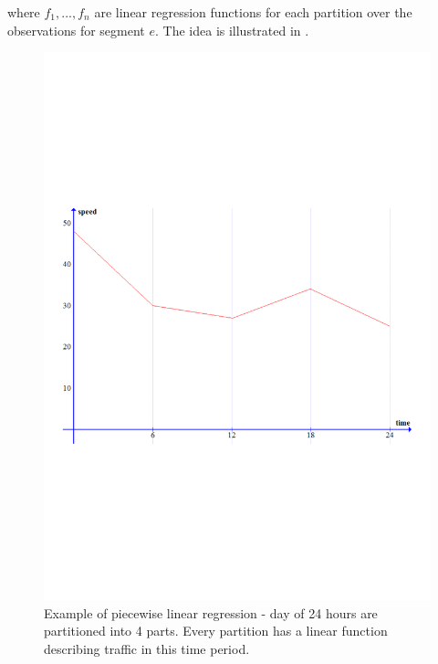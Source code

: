 where $f_1,...,f_n$ are linear regression functions for each partition over the observations for segment $e$. The idea is illustrated in .
\begin{figure}[H]
\centering
\includegraphics[trim={0 8cm 0 9cm},clip, width=\textwidth]{figures/piecewise.pdf}
\caption{Example of piecewise linear regression - day of 24 hours are partitioned into 4 parts. Every partition has a linear function describing traffic in this time period.}
\label{fig:segmented-regression}
\end{figure}
